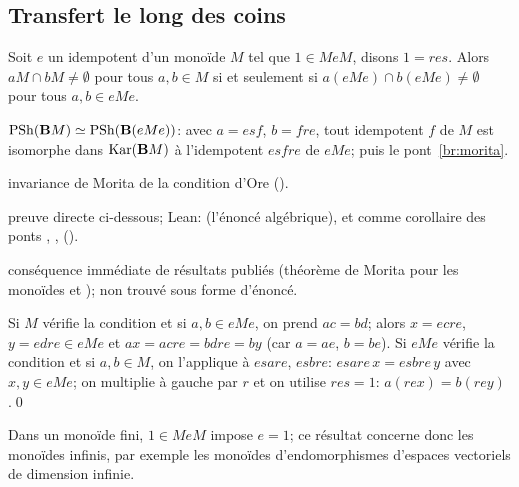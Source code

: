 \subsection{Transfert le long des coins}

\begin{theorem}\label{th:transfer}
Soit $e$ un idempotent d'un monoïde $M$ tel que $1\in MeM$, disons $1 = res$. Alors $aM\cap bM\neq\emptyset$ pour tous $a,b\in M$ si et seulement si $a(eMe)\cap b(eMe)\neq\emptyset$ pour tous $a,b\in eMe$.
\end{theorem}

\begin{trace}
\item[tablier] $\mathrm{PSh}(\mathbf{B} M)\simeq\mathrm{PSh}(\mathbf{B}(eMe))$: avec $a = esf$, $b = fre$, tout idempotent $f$ de $M$ est isomorphe dans $\operatorname{Kar}(\mathbf{B} M)$ à l'idempotent $esfre$ de $eMe$; puis le pont~\ref{br:morita}.
\item[arche] invariance de Morita de la condition d'Ore ().
\item[vérifier] preuve directe ci-dessous; Lean:  (l'énoncé algébrique), et comme corollaire des ponts , ,  ().
\item[nouveauté] conséquence immédiate de résultats publiés (théorème de Morita pour les monoïdes \cite{knauer,banaschewski,rogers-1905} et \cite[Th.~2.31]{hemelaer-rogers}); non trouvé sous forme d'énoncé.
\end{trace}

\direct{} Si $M$ vérifie la condition et si $a,b\in eMe$, on prend $ac = bd$; alors $x = ecre$, $y = edre\in eMe$ et $ax = acre = bdre = by$ (car $a = ae$, $b = be$). Si $eMe$ vérifie la condition et si $a,b\in M$, on l'applique à $esare$, $esbre$: $esare\,x = esbre\,y$ avec $x,y\in eMe$; on multiplie à gauche par $r$ et on utilise $res = 1$: $a(rex) = b(rey)$.\qed

Dans un monoïde fini, $1\in MeM$ impose $e = 1$; ce résultat concerne donc les monoïdes infinis, par exemple les monoïdes d'endomorphismes d'espaces vectoriels de dimension infinie.
